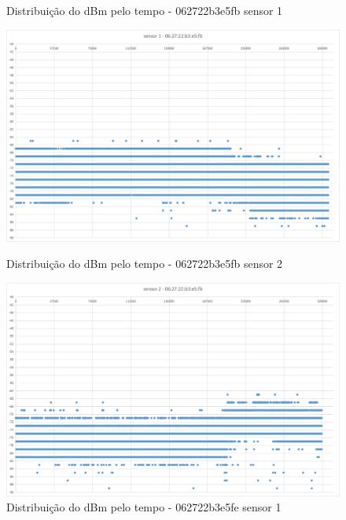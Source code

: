 \begin{figure}[htb]
	\begin{minipage}{0.49\textwidth}
	\centering
		\caption{\label{fig-062722b3e5fb-s1}Distribuição do dBm pelo tempo - 062722b3e5fb sensor 1}
		\includegraphics[width=1\textwidth]{060-testes/data-analisis/night-run/062722b3e5fb-sensor-01.png}
	\end{minipage}
\hfill
	\begin{minipage}{0.49\textwidth}
	\centering
		\caption{\label{fig-062722b3e5fb-s2}Distribuição do dBm pelo tempo - 062722b3e5fb sensor 2}
		\includegraphics[width=1\textwidth]{060-testes/data-analisis/night-run/062722b3e5fb-sensor-02.png}
	\end{minipage}
\hfill
	\begin{minipage}{0.49\textwidth}
	\centering
		\caption{\label{fig-062722b3e5fe-s1}Distribuição do dBm pelo tempo - 062722b3e5fe sensor 1}

\end{minipage}
\end{figure}
